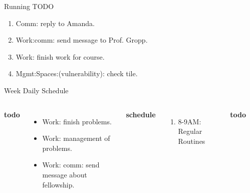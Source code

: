 \documentclass[serif, mathserif, final]{beamer}
\newcommand{\doneTask}[1]{\tiny \item \tiny \sout{#1}}
\begin{document}
\begin{frame}{}
\begin{columns}
\begin{column}{0.50\linewidth}
  \begin{block}{Running TODO} %
    \begin{enumerate} 
    \item \tiny Comm: reply to Amanda. 
    \item \tiny Work:comm: send message to Prof. Gropp.
    \item \tiny Work: finish work for course. 
    \item \tiny Mgmt:Spaces:(vulnerability): check tile. 
    \end{enumerate}
  \end{block} 
 
  \begin{block}{Week Daily Schedule} 

    \begin{columns} 
      \textbf{\small todo} \\ 
      \begin{itemize}
        \tiny \item \tiny Work: finish problems. 
      \item \tiny Work: management of problems.
      \item \tiny Work: comm: send message about fellowship.
      \end{itemize}  
     
  \textbf{\small schedule} \\
  \begin{enumerate} 
    \tiny \item \tiny 8-9AM: Regular Routines 
  \end{enumerate} 

  \textbf{\small todo} \\
  \begin{itemize} 
  

\end{itemize}
\end{columns}
\end{block}
\end{column}
\end{columns}
\end{frame}
\end{document}
